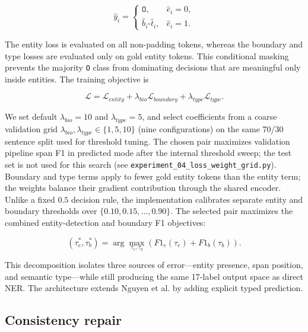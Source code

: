 \documentclass[conference,a4paper]{IEEEtran}
\begin{document}
\begin{equation}
\hat y_i=
\begin{cases}
\texttt{O}, & \hat e_i=0,\\
\hat b_i\texttt{-}\hat t_i, & \hat e_i=1.
\end{cases}
\end{equation}

The entity loss is evaluated on all non-padding tokens, whereas the boundary and type losses are evaluated only on gold entity tokens. This conditional masking prevents the majority \texttt{O} class from dominating decisions that are meaningful only inside entities. The training objective is

\begin{equation}
\mathcal L=\mathcal L_{entity}
+\lambda_{bio}\mathcal L_{boundary}+\lambda_{type}\mathcal L_{type}.
\end{equation}

We set default $\lambda_{bio}=10$ and $\lambda_{type}=5$, and select coefficients from a coarse validation grid $\lambda_{bio},\lambda_{type}\in\{1,5,10\}$ (nine configurations) on the same 70/30 sentence split used for threshold tuning. The chosen pair maximizes validation pipeline span F1 in predicted mode after the internal threshold sweep; the test set is not used for this search (see \texttt{experiment\_04\_loss\_weight\_grid.py}). Boundary and type terms apply to fewer gold entity tokens than the entity term; the weights balance their gradient contribution through the shared encoder. Unlike a fixed $0.5$ decision rule, the implementation calibrates separate entity and boundary thresholds over
$\{0.10,0.15,\ldots,0.90\}$. The selected pair maximizes the combined entity-detection and boundary F1 objectives:

\begin{equation}
(\tau_e^*,\tau_b^*)=
\arg\max_{\tau_e,\tau_b}
\left(F1_e(\tau_e)+F1_b(\tau_b)\right).
\end{equation}

This decomposition isolates three sources of error---entity presence, span position, and semantic type---while still producing the same 17-label output space as direct NER. The architecture extends Nguyen et al. \cite{nguyen2023auc} by adding explicit typed prediction.

\subsection{Consistency repair}
\end{document}
